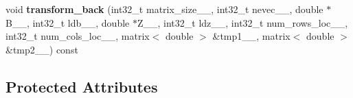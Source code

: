 \begin{DoxyCompactItemize}
\item 
\hypertarget{class_eigenproblem__elpa_a81556fb9c1595455952bc5491d7bb041}{}void {\bfseries transform\+\_\+back} (int32\+\_\+t matrix\+\_\+size\+\_\+\+\_\+, int32\+\_\+t nevec\+\_\+\+\_\+, double $\ast$B\+\_\+\+\_\+, int32\+\_\+t ldb\+\_\+\+\_\+, double $\ast$Z\+\_\+\+\_\+, int32\+\_\+t ldz\+\_\+\+\_\+, int32\+\_\+t num\+\_\+rows\+\_\+loc\+\_\+\+\_\+, int32\+\_\+t num\+\_\+cols\+\_\+loc\+\_\+\+\_\+, matrix$<$ double $>$ \&tmp1\+\_\+\+\_\+, matrix$<$ double $>$ \&tmp2\+\_\+\+\_\+) const \label{class_eigenproblem__elpa_a81556fb9c1595455952bc5491d7bb041}

\end{DoxyCompactItemize}
\subsection*{Protected Attributes}
